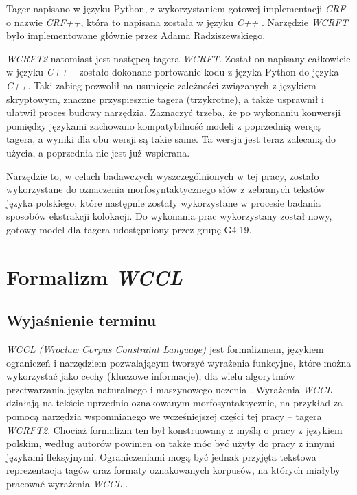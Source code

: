 \par
Tager napisano w języku Python, z wykorzystaniem gotowej implementacji \emph{CRF} o nazwie \emph{CRF++}, która to napisana została w języku \emph{C++} \cite{wcrft}.
Narzędzie \emph{WCRFT} było implementowane głównie przez Adama Radziszewskiego.

\par
\emph{WCRFT2} natomiast jest następcą tagera \emph{WCRFT}.
Został on napisany całkowicie w języku \emph{C++} -- zostało dokonane portowanie kodu z języka Python do języka \emph{C++}.
Taki zabieg pozwolił na usunięcie zależności związanych z językiem skryptowym, znaczne przyspiesznie tagera (trzykrotne), a także usprawnił i ułatwił proces budowy narzędzia.
Zaznaczyć trzeba, że po wykonaniu konwersji pomiędzy językami zachowano kompatybilność modeli z poprzednią wersją tagera, a wyniki dla obu wersji są takie same.
Ta wersja jest teraz zalecaną do użycia, a poprzednia nie jest już wspierana.

\par
Narzędzie to, w celach badawczych wyszczególnionych w tej pracy, zostało wykorzystane do oznaczenia morfosyntaktycznego słów z zebranych tekstów języka polskiego, które następnie zostały wykorzystane w procesie badania sposobów ekstrakcji kolokacji.
Do wykonania prac wykorzystany został nowy, gotowy model dla tagera udostępniony przez grupę G4.19.

\section{Formalizm \protect\textit{WCCL}}
\subsection{Wyjaśnienie terminu}
\emph{WCCL (Wrocław Corpus Constraint Language)} \cite{wccl_web} jest formalizmem, językiem ograniczeń i narzędziem pozwalającym tworzyć wyrażenia funkcyjne, które można wykorzystać jako cechy (kluczowe informacje), dla wielu algorytmów przetwarzania języka naturalnego i maszynowego uczenia \cite{wccl}. 
Wyrażenia \emph{WCCL} działają na tekście uprzednio oznakowanym morfosyntaktycznie, na przykład za pomocą narzędzia wspomnianego we wcześniejszej części tej pracy -- tagera \emph{WCRFT2}. 
Chociaż formalizm ten był konstruowany z myślą o pracy z językiem polskim, według autorów powinien on także móc być użyty do pracy z innymi językami fleksyjnymi. 
Ograniczeniami mogą być jednak przyjęta tekstowa reprezentacja tagów oraz formaty oznakowanych korpusów, na których miałyby pracować wyrażenia \emph{WCCL} \cite[str. 1]{wccl}.

